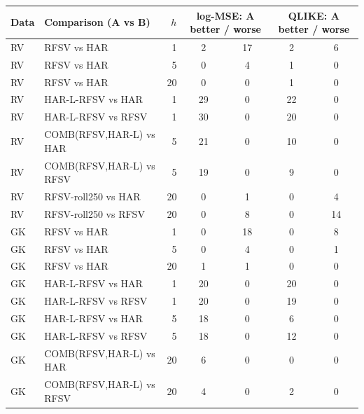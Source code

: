\begin{tabular}{llrcccc}
\toprule
Data & Comparison (A vs B) & $h$ & \multicolumn{2}{c}{log-MSE: A better / worse} & \multicolumn{2}{c}{QLIKE: A better / worse}\\
\midrule
RV & RFSV vs HAR & 1 & 2 & 17 & 2 & 6\\
RV & RFSV vs HAR & 5 & 0 & 4 & 1 & 0\\
RV & RFSV vs HAR & 20 & 0 & 0 & 1 & 0\\
RV & HAR-L-RFSV vs HAR & 1 & 29 & 0 & 22 & 0\\
RV & HAR-L-RFSV vs RFSV & 1 & 30 & 0 & 20 & 0\\
RV & COMB(RFSV,HAR-L) vs HAR & 5 & 21 & 0 & 10 & 0\\
RV & COMB(RFSV,HAR-L) vs RFSV & 5 & 19 & 0 & 9 & 0\\
RV & RFSV-roll250 vs HAR & 20 & 0 & 1 & 0 & 4\\
RV & RFSV-roll250 vs RFSV & 20 & 0 & 8 & 0 & 14\\
\midrule
GK & RFSV vs HAR & 1 & 0 & 18 & 0 & 8\\
GK & RFSV vs HAR & 5 & 0 & 4 & 0 & 1\\
GK & RFSV vs HAR & 20 & 1 & 1 & 0 & 0\\
GK & HAR-L-RFSV vs HAR & 1 & 20 & 0 & 20 & 0\\
GK & HAR-L-RFSV vs RFSV & 1 & 20 & 0 & 19 & 0\\
GK & HAR-L-RFSV vs HAR & 5 & 18 & 0 & 6 & 0\\
GK & HAR-L-RFSV vs RFSV & 5 & 18 & 0 & 12 & 0\\
GK & COMB(RFSV,HAR-L) vs HAR & 20 & 6 & 0 & 0 & 0\\
GK & COMB(RFSV,HAR-L) vs RFSV & 20 & 4 & 0 & 2 & 0\\
\bottomrule
\end{tabular}